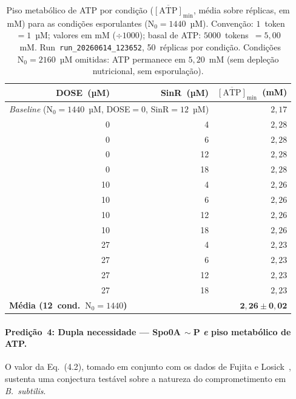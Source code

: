\begin{table}[htbp]
\centering
\caption{Piso metabólico de ATP por condição
($\overline{[\text{ATP}]}_{\min}$, média sobre réplicas, em mM)
para as condições esporulantes ($\text{N}_0=1440$~µM).
Convenção: $1$~token~$= 1$~µM; valores em mM ($\div 1000$);
basal de ATP: $5000$~tokens~$= 5{,}00$~mM.
Run~\texttt{run\_20260614\_123652}, 50~réplicas por condição.
Condições $\text{N}_0=2160$~µM omitidas: ATP permanece em
$5{,}20$~mM (sem depleção nutricional, sem esporulação).}
\label{tab:v6-atp-floor}
\small
\begin{tabular}{@{}rrr@{}}
\toprule
DOSE~(µM) & SinR~(µM) &
  $\overline{[\text{ATP}]}_{\min}$~(mM) \\
\midrule
\multicolumn{2}{l}{\textit{Baseline} ($\text{N}_0{=}1440$~µM, DOSE$=0$, SinR$=12$~µM)}
  & $2{,}17$ \\
\midrule
  0 &  4 & $2{,}28$ \\
  0 &  6 & $2{,}28$ \\
  0 & 12 & $2{,}28$ \\
  0 & 18 & $2{,}28$ \\
\midrule
 10 &  4 & $2{,}26$ \\
 10 &  6 & $2{,}26$ \\
 10 & 12 & $2{,}26$ \\
 10 & 18 & $2{,}26$ \\
\midrule
 27 &  4 & $2{,}23$ \\
 27 &  6 & $2{,}23$ \\
 27 & 12 & $2{,}23$ \\
 27 & 18 & $2{,}23$ \\
\midrule
\multicolumn{2}{l}{\textbf{Média (12~cond.\ $\text{N}_0=1440$)}}
  & $\mathbf{2{,}26 \pm 0{,}02}$ \\
\bottomrule
\end{tabular}
\end{table}
\paragraph{Predição~4: Dupla necessidade --- Spo0A$\,{\sim}$P \emph{e} piso metabólico de ATP.}
\label{par:predicao-dupla-necessidade}
O valor da Eq.~(4.2), tomado em conjunto com os dados de
Fujita e Losick~\cite{Fujita2005}, sustenta uma conjectura testável
sobre a natureza do comprometimento em \textit{B.~subtilis}.

